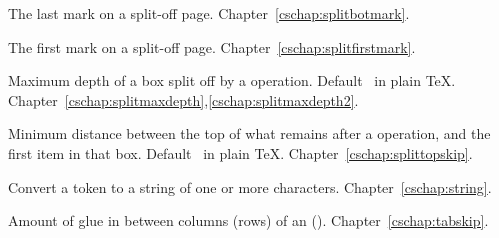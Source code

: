 \begin{glossinventory}
\item [\cs{splitbotmark}]
      The last mark on a split-off page.
Chapter~\ref{cschap:splitbotmark}.

\item [\cs{splitfirstmark}]
      The first mark on a split-off page.
Chapter~\ref{cschap:splitfirstmark}.

\item [\cs{splitmaxdepth}]
      Maximum depth of a box split off by a  operation. 
      Default~\n{4pt} in plain \TeX.
Chapter~\ref{cschap:splitmaxdepth},\ref{cschap:splitmaxdepth2}.

\item [\cs{splittopskip}]
      Minimum distance between the top of what remains after a
       operation, and the first item in that box.
      Default~\n{10pt} in plain \TeX.
Chapter~\ref{cschap:splittopskip}.

\item [\cs{string\gr{token}}]
      Convert a token to a string of one or more characters. 
Chapter~\ref{cschap:string}.

\item [\cs{tabskip}]
      Amount of glue in between columns (rows) of an 
 \alt
      ().
Chapter~\ref{cschap:tabskip}.


\end{glossinventory}
